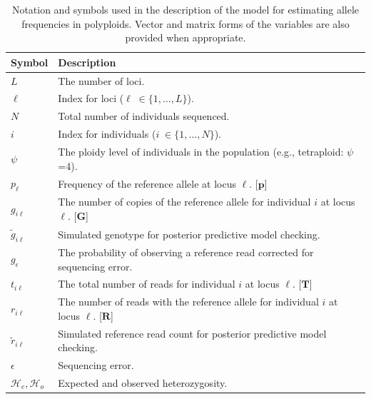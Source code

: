 \documentclass[11pt,english,letterpaper,oneside]{article}
\begin{document}

\begin{table}
\centering
{}
\caption{Notation and symbols used in the description of the model for estimating allele frequencies in polyploids. Vector and matrix forms of the variables are also provided when appropriate.}
\vspace{0.25in}
\bgroup
\def\arraystretch{1.45}
\begin{tabular}[l]{l | l}
\hline
\textbf{Symbol} & \textbf{Description}\\ \hline
$L$ & The number of loci. \\
$\ell$ & Index for loci ($\ell\; \in \{1,\ldots,L\}$). \\
$N$ & Total number of individuals sequenced. \\
$i$ & Index for individuals ($i\; \in \{1,\ldots,N\}$). \\
$\psi$ & The ploidy level of individuals in the population (e.g., tetraploid: $\psi$=4). \\
$p_{\ell}$ & Frequency of the reference allele at locus $\ell$. [$\bm{p}$] \\
$g_{i \ell}$ & The number of copies of the reference allele for individual $i$ at locus $\ell$. [$\bm{G}$] \\
$\tilde{g}_{i \ell}$ & Simulated genotype for posterior predictive model checking. \\
$g_\epsilon$ & The probability of observing a reference read corrected for sequencing error. \\
$t_{i \ell}$ & The total number of reads for individual $i$ at locus $\ell$. [$\bm{T}$] \\
$r_{i \ell}$ & The number of reads with the reference allele for individual $i$ at locus $\ell$. [$\bm{R}$] \\
$\tilde{r}_{i \ell}$ & Simulated reference read count for posterior predictive model checking. \\
$\epsilon$ & Sequencing error. \\
$\mathcal{H}_e, \mathcal{H}_o$ & Expected and observed heterozygosity.\\
\hline
\end{tabular}
\egroup
\label{table1}
\vspace{0.25in}
\end{table}

\end{document}
